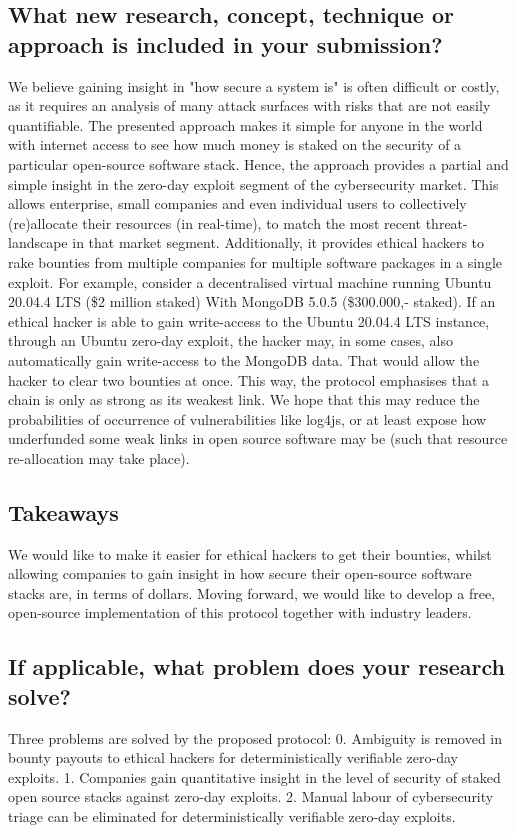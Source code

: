 \documentclass{article}
\begin{document}
\subsection{What new research, concept, technique or approach is included in your submission?}
We believe gaining insight in "how secure a system is" is often difficult or costly, as it requires an analysis of many attack surfaces with risks that are not easily quantifiable. The presented approach makes it simple for anyone in the world with internet access to see how much money is staked on the security of a particular open-source software stack. Hence, the approach provides a partial and simple insight in the zero-day exploit segment of the cybersecurity market. This allows enterprise, small companies and even individual users to collectively (re)allocate their resources (in real-time), to match the most recent threat-landscape in that market segment. Additionally, it provides ethical hackers to rake bounties from multiple companies for multiple software packages in a single exploit. For example, consider a decentralised virtual machine running Ubuntu 20.04.4 LTS (\$2 million staked) With MongoDB 5.0.5 (\$300.000,- staked). If an ethical hacker is able to gain write-access to the Ubuntu 20.04.4 LTS instance, through an Ubuntu zero-day exploit, the hacker may, in some cases, also automatically gain write-access to the MongoDB data. That would allow the hacker to clear two bounties at once. This way, the protocol emphasises that a chain is only as strong as its weakest link. We hope that this may reduce the probabilities of occurrence of vulnerabilities like log4js, or at least expose how underfunded some weak links in open source software may be (such that resource re-allocation may take place).

\subsection{Takeaways}
We would like to make it easier for ethical hackers to get their bounties, whilst allowing companies to gain insight in how secure their open-source software stacks are, in terms of dollars. Moving forward, we would like to develop a free, open-source implementation of this protocol together with industry leaders.
\subsection{If applicable, what problem does your research solve?}
Three problems are solved by the proposed protocol:
0. Ambiguity is removed in bounty payouts to ethical hackers for deterministically verifiable zero-day exploits.
1. Companies gain quantitative insight in the level of security of staked open source stacks against zero-day exploits.
2. Manual labour of cybersecurity triage can be eliminated for deterministically verifiable zero-day exploits.
\end{document}
